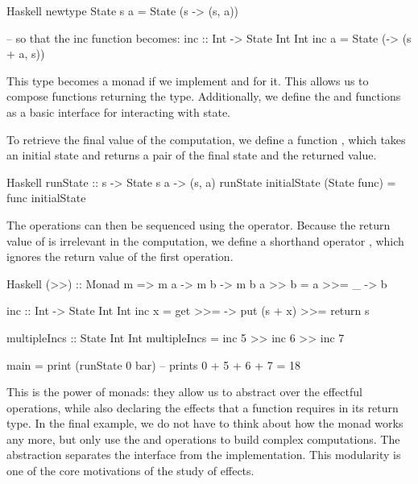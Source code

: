 \begin{lst}{Haskell}
newtype State s a = State (s -> (s, a))

-- so that the inc function becomes:
inc :: Int -> State Int Int
inc a = State (\s -> (s + a, s))
\end{lst}
%
This  type becomes a monad if we implement  and \hs{>>=} for it. This allows us to compose functions returning the  type. Additionally, we define the  and  functions as a basic interface for interacting with state.

%
To retrieve the final value of the computation, we define a function , which takes an initial state and returns a pair of the final state and the returned value.

\begin{lst}{Haskell}
runState :: s -> State s a -> (s, a)
runState initialState (State func) = func initialState
\end{lst}
%
The  operations can then be sequenced using the \hs{>>=} operator. Because the return value of  is irrelevant in the computation, we define a shorthand operator \hs{>>}, which ignores the return value of the first operation.

\begin{lst}{Haskell}
(>>) :: Monad m => m a -> m b -> m b
a >> b = a >>= \_ -> b

inc :: Int -> State Int Int
inc x = get >>= \s -> put (s + x) >>= return s

multipleIncs :: State Int Int
multipleIncs = inc 5 >> inc 6 >> inc 7

main = print (runState 0 bar) -- prints 0 + 5 + 6 + 7 = 18
\end{lst}
%
This is the power of monads: they allow us to abstract over the effectful operations, while also declaring the effects that a function requires in its return type. In the final example, we do not have to think about how the  monad works any more, but only use the  and  operations to build complex computations. The abstraction separates the interface from the implementation. This modularity is one of the core motivations of the study of effects. 

